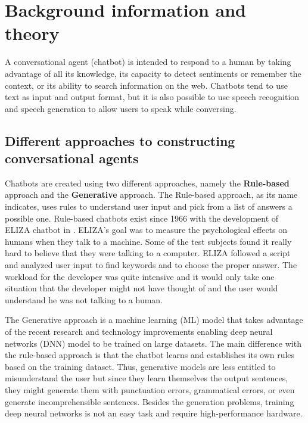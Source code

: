 
\chapter{Background information and theory} %

\label{Chapter2} %

A conversational agent (chatbot) is intended to respond to a human by taking advantage of all its knowledge, its capacity to detect sentiments or remember the context, or its ability to search information on the web. Chatbots tend to use text as input and output format, but it is also possible to use speech recognition and speech generation to allow users to speak while conversing.

\section{Different approaches to constructing conversational agents}
Chatbots are created using two different approaches, namely the \textbf{Rule-based} approach and the \textbf{Generative} approach. The Rule-based approach, as its name indicates, uses rules to understand user input and pick from a list of answers a possible one. Rule-based chatbots exist since 1966 with the development of ELIZA chatbot in \citet{Weizenbaum:1966:ECP:365153.365168}. ELIZA's goal was to measure the psychological effects on humans when they talk to a machine. Some of the test subjects found it really hard to believe that they were talking to a computer. ELIZA followed a script and analyzed user input to find keywords and to choose the proper answer. The workload for the developer was quite intensive and it would only take one situation that the developer might not have thought of and the user would understand he was not talking to a human.

The Generative approach is a machine learning (ML) model that takes advantage of the recent research and technology improvements enabling deep neural networks (DNN) model to be trained on large datasets. The main difference with the rule-based approach is that the chatbot learns and establishes its own rules based on the training dataset. Thus, generative models are less entitled to misunderstand the user but since they learn themselves the output sentences, they might generate them with punctuation errors, grammatical errors, or even generate incomprehensible sentences. Besides the generation problems, training deep neural networks is not an easy task and require high-performance hardware.

